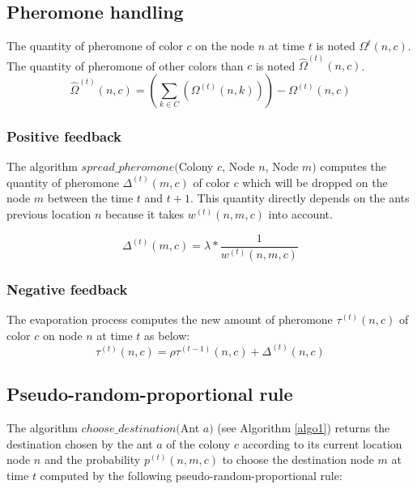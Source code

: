 \documentclass[a4paper,10pt]{article}
\begin{document}
\subsection{Pheromone handling}
The quantity of pheromone of color $c$ on the node $n$ at time $t$ is noted $\Omega^{t}(n,c)$. The quantity of pheromone of other colors than $c$ is noted $\hat \Omega^{(t)}(n,c)$.
\begin{equation*}
    \hat \Omega^{(t)}(n,c) = \left( \sum_{k \in C}(\Omega^{(t)} (n,k)) \right) - \Omega^{(t)} (n,c)
\end{equation*}



\subsubsection{Positive feedback}
The algorithm $spread\_pheromone($Colony $c$, Node $n$, Node $m)$ computes the quantity of pheromone $\Delta^{(t)}(m,c)$ of color $c$  which will be dropped on the node $m$ between the time $t$ and $t+1$. This quantity directly depends on the ants previous location $n$ because it takes $w^{(t)}(n,m,c)$ into account.

\begin{equation*}
 \Delta^{(t)}(m,c) = \lambda * \frac{1}{w^{(t)}(n,m,c)}
\end{equation*}

\subsubsection{Negative feedback}
The evaporation process computes the new amount of pheromone $\tau^{(t)}(n,c)$ of color $c$ on node $n$ at time $t$ as below:
\begin{equation*}
 \tau^{(t)}(n,c) = \rho \tau^{(t-1)}(n,c) + \Delta^{(t)}(n,c)
\end{equation*}

\subsection{Pseudo-random-proportional rule}
The algorithm $choose\_destination($Ant $a)$ (see Algorithm \ref{algo1}) returns the destination chosen by the ant $a$ of the colony $c$ according to its current location node $n$ and the probability $p^{(t)}(n,m,c)$ to choose the destination node $m$ at time $t$ computed by the following pseudo-random-proportional rule:
\end{document}

